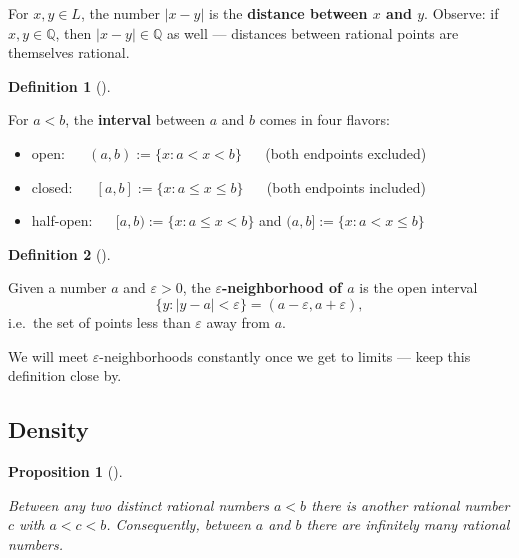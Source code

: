 \documentclass[
  letterpaper,
  DIV=11,
  numbers=noendperiod]{scrreprt}
\providecommand{\tightlist}{%
  \setlength{\itemsep}{0pt}\setlength{\parskip}{0pt}}
\theoremstyle{plain}
\theoremstyle{plain}
\newtheorem{proposition}{Proposition}[chapter]
\theoremstyle{definition}
\newtheorem{definition}{Definition}[chapter]
\theoremstyle{definition}
\theoremstyle{definition}
\theoremstyle{plain}
\theoremstyle{plain}
\theoremstyle{remark}
\begin{document}
For \(x,y\in L\), the number \(|x-y|\) is the \textbf{distance between
\(x\) and \(y\)}. Observe: if \(x,y\in\mathbb{Q}\), then
\(|x-y|\in\mathbb{Q}\) as well --- distances between rational points are
themselves rational.

\begin{definition}[]\protect\hypertarget{def-interval}{}\label{def-interval}

\hfill\break
For \(a<b\), the \textbf{interval} between \(a\) and \(b\) comes in four
flavors:

\begin{itemize}
\tightlist
\item
  open:   \((a,b) := \{x : a<x<b\}\)   (both endpoints excluded)
\item
  closed:   \([a,b] := \{x : a\le x\le b\}\)   (both endpoints included)
\item
  half-open:   \([a,b) := \{x: a \le x < b\}\) and
  \((a,b] := \{x : a< x \le b\}\)
\end{itemize}

\end{definition}

\begin{definition}[]\protect\hypertarget{def-neighborhood}{}\label{def-neighborhood}

\hfill\break
Given a number \(a\) and \(\varepsilon>0\), the
\textbf{\(\varepsilon\)-neighborhood of \(a\)} is the open interval \[
\{y : |y-a| < \varepsilon\} = (a-\varepsilon, a+\varepsilon),
\] i.e.~the set of points less than \(\varepsilon\) away from \(a\).

\end{definition}

We will meet \(\varepsilon\)-neighborhoods constantly once we get to
limits --- keep this definition close by.

\subsection{Density}\label{density}

\begin{proposition}[]\protect\hypertarget{prp-density}{}\label{prp-density}

\hfill\break
Between any two distinct rational numbers \(a<b\) there is another
rational number \(c\) with \(a<c<b\). Consequently, between \(a\) and
\(b\) there are infinitely many rational numbers.

\end{proposition}
\end{document}
